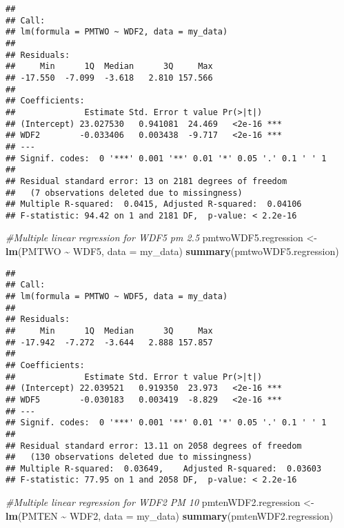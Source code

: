 \documentclass[
]{article}
\newenvironment{Shaded}{\begin{snugshade}}{\end{snugshade}}
\newcommand{\AttributeTok}[1]{\textcolor[rgb]{0.13,0.29,0.53}{#1}}
\newcommand{\CommentTok}[1]{\textcolor[rgb]{0.56,0.35,0.01}{\textit{#1}}}
\newcommand{\FunctionTok}[1]{\textcolor[rgb]{0.13,0.29,0.53}{\textbf{#1}}}
\newcommand{\NormalTok}[1]{#1}
\newcommand{\OtherTok}[1]{\textcolor[rgb]{0.56,0.35,0.01}{#1}}
\newcommand{\SpecialCharTok}[1]{\textcolor[rgb]{0.81,0.36,0.00}{\textbf{#1}}}
\begin{document}
\begin{verbatim}
## 
## Call:
## lm(formula = PMTWO ~ WDF2, data = my_data)
## 
## Residuals:
##     Min      1Q  Median      3Q     Max 
## -17.550  -7.099  -3.618   2.810 157.566 
## 
## Coefficients:
##              Estimate Std. Error t value Pr(>|t|)    
## (Intercept) 23.027530   0.941081  24.469   <2e-16 ***
## WDF2        -0.033406   0.003438  -9.717   <2e-16 ***
## ---
## Signif. codes:  0 '***' 0.001 '**' 0.01 '*' 0.05 '.' 0.1 ' ' 1
## 
## Residual standard error: 13 on 2181 degrees of freedom
##   (7 observations deleted due to missingness)
## Multiple R-squared:  0.0415, Adjusted R-squared:  0.04106 
## F-statistic: 94.42 on 1 and 2181 DF,  p-value: < 2.2e-16
\end{verbatim}

\begin{Shaded}
\begin{Highlighting}[]
\CommentTok{\#Multiple linear regression for WDF5 pm 2.5}
\NormalTok{pmtwoWDF5.regression }\OtherTok{\textless{}{-}} \FunctionTok{lm}\NormalTok{(PMTWO }\SpecialCharTok{\textasciitilde{}}\NormalTok{ WDF5, }\AttributeTok{data =}\NormalTok{ my\_data)}
\FunctionTok{summary}\NormalTok{(pmtwoWDF5.regression)}
\end{Highlighting}
\end{Shaded}

\begin{verbatim}
## 
## Call:
## lm(formula = PMTWO ~ WDF5, data = my_data)
## 
## Residuals:
##     Min      1Q  Median      3Q     Max 
## -17.942  -7.272  -3.644   2.888 157.857 
## 
## Coefficients:
##              Estimate Std. Error t value Pr(>|t|)    
## (Intercept) 22.039521   0.919350  23.973   <2e-16 ***
## WDF5        -0.030183   0.003419  -8.829   <2e-16 ***
## ---
## Signif. codes:  0 '***' 0.001 '**' 0.01 '*' 0.05 '.' 0.1 ' ' 1
## 
## Residual standard error: 13.11 on 2058 degrees of freedom
##   (130 observations deleted due to missingness)
## Multiple R-squared:  0.03649,    Adjusted R-squared:  0.03603 
## F-statistic: 77.95 on 1 and 2058 DF,  p-value: < 2.2e-16
\end{verbatim}

\begin{Shaded}
\begin{Highlighting}[]
\CommentTok{\#Multiple linear regression for WDF2 PM 10 }
\NormalTok{pmtenWDF2.regression }\OtherTok{\textless{}{-}} \FunctionTok{lm}\NormalTok{(PMTEN }\SpecialCharTok{\textasciitilde{}}\NormalTok{ WDF2, }\AttributeTok{data =}\NormalTok{ my\_data)}
\FunctionTok{summary}\NormalTok{(pmtenWDF2.regression)}
\end{Highlighting}
\end{Shaded}
\end{document}
